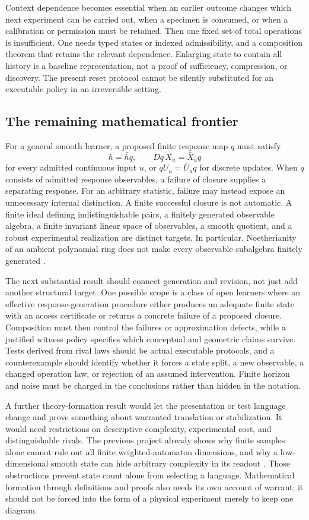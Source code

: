 \documentclass[11pt]{article}
\theoremstyle{definition}\newtheorem{definition}[theorem]{Definition}
\theoremstyle{remark}\newtheorem{remark}[theorem]{Remark}
\begin{document}
Context dependence becomes essential when an earlier outcome changes which
next experiment can be carried out, when a specimen is consumed, or when a
calibration or permission must be retained. Then one fixed set of total
operations is insufficient. One needs typed states or indexed admissibility,
and a composition theorem that retains the relevant dependence. Enlarging
state to contain all history is a baseline representation, not a proof of
sufficiency, compression, or discovery. The present reset protocol cannot
be silently substituted for an executable policy in an irreversible setting.

\subsection{The remaining mathematical frontier}
For a general smooth learner, a proposed finite response map $q$ must satisfy
\[
 h=\bar hq,\qquad Dq\,X_u=\bar X_uq
\]
for every admitted continuous input $u$, or $qU_u=\bar U_uq$ for discrete
updates. When $q$ consists of admitted response observables, a failure of
closure supplies a separating response. For an arbitrary statistic, failure
may instead expose an unnecessary internal distinction. A finite successful
closure is not automatic. A finite ideal defining indistinguishable pairs,
a finitely generated observable algebra, a finite invariant linear space
of observables, a smooth quotient, and a robust experimental realization
are distinct targets. In particular, Noetherianity of an ambient polynomial
ring does not make every observable subalgebra finitely generated
\cite{sontag,boreale,kawano}.

The next substantial result should connect generation and revision, not
just add another structural target. One possible scope is a class of open
learners where an effective response-generation procedure either produces
an adequate finite state with an access certificate or returns a concrete
failure of a proposed closure. Composition must then control the failures
or approximation defects, while a justified witness policy specifies which
conceptual and geometric claims survive. Tests derived from rival laws
should be actual executable protocols, and a counterexample should identify
whether it forces a state split, a new observable, a changed operation law,
or rejection of an assumed intervention. Finite horizon and noise must be
charged in the conclusions rather than hidden in the notation.

A further theory-formation result would let the presentation or test language
change and prove something about warranted translation or stabilization.
It would need restrictions on descriptive complexity, experimental cost,
and distinguishable rivals. The previous project already shows why finite
samples alone cannot rule out all finite weighted-automaton dimensions, and
why a low-dimensional smooth state can hide arbitrary complexity in its
readout \cite{project}. Those obstructions prevent state count alone from
selecting a language. Mathematical formation through definitions and proofs
also needs its own account of warrant; it should not be forced into the
form of a physical experiment merely to keep one diagram.
\end{document}
